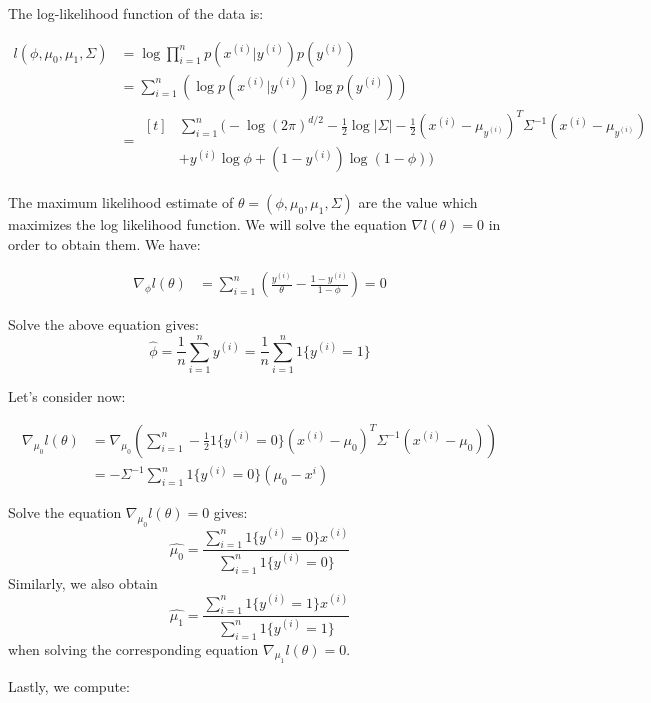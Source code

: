 \begin{answer}
The log-likelihood function of the data is:

\begin{align}
	l(\phi, \mu_0, \mu_1, \Sigma)
	&= \log \prod \limits_{i = 1}^{n} p(x^{(i)}|y^{(i)})p(y^{(i)}) \\
	&= \sum \limits_{i = 1}^{n} (\log p(x^{(i)}|y^{(i)}) \log p(y^{(i)})) \\
	&= 
	\begin{aligned}[t]
		& \sum \limits_{i = 1}^{n} \bigg( -\log (2\pi)^{d/2} - \frac{1}{2}\log |\Sigma| - \frac{1}{2}(x^{(i)} - \mu_{y^{(i)}})^T \Sigma^{-1} (x^{(i)} - \mu_{y^{(i)}}) \\
		& + y^{(i)}\log\phi + (1 - y^{(i)})\log(1 - \phi) \bigg)
	\end{aligned}
\end{align}

The maximum likelihood estimate of  $\theta = (\phi, \mu_0, \mu_1, \Sigma)$ are the value which maximizes the log likelihood function. We will solve the equation $\nabla l(\theta) = 0$ in order to obtain them. We have:

\begin{align}
	\nabla_{\phi} l(\theta) 
	&= \sum \limits_{i = 1}^{n} \left( \frac{y^{(i)}}{\theta} - \frac{1 - y^{(i)}}{1 - \phi} \right)
	= 0
\end{align}

Solve the above equation gives:
$$\hat{\phi} = \frac{1}{n} \sum \limits_{i = 1}^{n} y^{(i)} = \frac{1}{n} \sum \limits_{i = 1}^{n} 1\{y^{(i)} = 1\}$$

Let's consider now:

\begin{align}
	\nabla_{\mu_0} l(\theta) &
	= \nabla_{\mu_0} \left( \sum \limits_{i = 1}^{n} - \frac{1}{2} 1\{y^{(i)} = 0\} (x^{(i)} - \mu_0)^T \Sigma^{-1} (x^{(i)} - \mu_0) \right) \\
	&= - \Sigma^{-1} \sum \limits_{i = 1}^{n} 1\{y^{(i)} = 0\}(\mu_0 - x^{i})
\end{align}

Solve the equation $\nabla_{\mu_0} l(\theta) = 0$ gives: $$\widehat{\mu_0} = \frac{ \sum_{i = 1}^{n} 1\{y^{(i)} = 0\}x^{(i)}}{\sum_{i = 1}^{n} 1\{y^{(i)} = 0\}}$$
Similarly, we also obtain $$\widehat{\mu_1} = \frac{ \sum_{i = 1}^{n} 1\{y^{(i)} = 1\}x^{(i)}}{\sum_{i = 1}^{n} 1\{y^{(i)} = 1\}}$$ when solving the corresponding equation $\nabla_{\mu_1} l(\theta) = 0$.

Lastly, we compute:


\end{answer}
